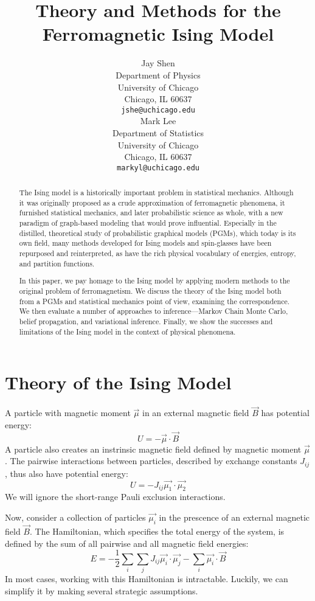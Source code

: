 \documentclass{article}
\title{Theory and Methods for the Ferromagnetic Ising Model}
\author{
    Jay Shen \\
    Department of Physics \\
    University of Chicago\\
    Chicago, IL 60637 \\
    \texttt{jshe@uchicago.edu} \\
    \And
    Mark Lee \\
    Department of Statistics \\
    University of Chicago\\
    Chicago, IL 60637 \\
    \texttt{markyl@uchicago.edu} \\
}
\begin{document}
\maketitle

\begin{abstract}

The Ising model is a historically important problem in statistical mechanics. 
Although it was originally proposed as a crude approximation of ferromagnetic 
phenomena, it furnished statistical mechanics, and later probabilistic science 
as whole, with a new paradigm of graph-based modeling that would prove 
influential.
Especially in the distilled, theoretical study of probabilistic graphical 
models (PGMs), which today is its own field, many methods developed for Ising models 
and spin-glasses have been repurposed and reinterpreted, as have the rich 
physical vocabulary of energies, entropy, and partition functions. 

In this paper, we pay homage to the Ising model by applying modern methods to 
the original problem of ferromagnetism. 
We discuss the theory of the Ising model both from a PGMs and statistical 
mechanics point of view, examining the correspondence. 
We then evaluate a number of approaches to inference—Markov Chain Monte Carlo, 
belief propagation, and variational inference. 
Finally, we show the successes and limitations of the Ising model in the context 
of physical phenomena. 

\end{abstract}


\section{Theory of the Ising Model}

A particle with magnetic moment $\vec{\mu}$ in an external magnetic field 
$\vec{B}$ has potential energy:
\[U = - \vec{\mu} \cdot \vec{B}\]
A particle also creates an instrinsic magnetic field defined by magnetic moment 
$\vec{\mu}$. 
The pairwise interactions between particles, described by exchange constants 
$J_{ij}$, thus also have potential energy:
\[U = - J_{ij} \vec{\mu_1} \cdot \vec{\mu_2}\]
We will ignore the short-range Pauli exclusion interactions. 

Now, consider a collection of particles $\vec{\mu_i}$ in the prescence of an 
external magnetic field $\vec{B}$. 
The Hamiltonian, which specifies the total energy of the system, is defined by 
the sum of all pairwise and all magnetic field energies:
\begin{equation}\label{exactE}
    E = -\frac{1}{2}\sum_i \sum_j J_{ij} \vec{\mu_i} \cdot \vec{\mu_j} - \sum_i \vec{\mu_i} \cdot \vec{B}
\end{equation}
In most cases, working with this Hamiltonian is intractable. 
Luckily, we can simplify it by making several strategic assumptions. 
\end{document}
